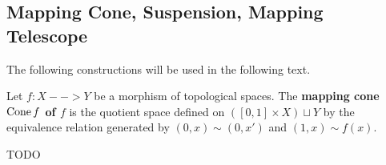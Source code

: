

	\newpage
	\subsection{Mapping Cone, Suspension, Mapping Telescope}

	The following constructions will be used in the following text.

	\begin{definition}
		Let $f:X-->Y$ be a morphism of topological spaces. The \textbf{mapping cone $\operatorname{Cone} f$ of $f$} is the quotient space defined on $([0,1] \times X) \sqcup Y$ by the equivalence relation generated by $(0,x) \sim (0, x')$ and $(1,x) \sim f(x)$.
	\end{definition}

	\begin{lemma}
		TODO
	\end{lemma}

